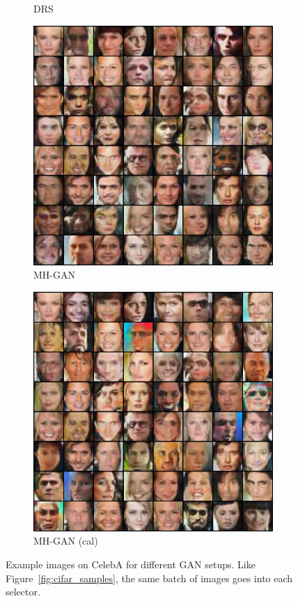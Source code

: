 \begin{figure}[htbp]
\begin{subfigure}[b]{0.49\textwidth}
       \caption{DRS}
    \end{subfigure}
    \begin{subfigure}[b]{0.49\textwidth}
       \centering
       \includegraphics[width=\exfactor\textwidth]{figures/celeba/31_base_raw_MH.jpg}
       \caption{MH-GAN}
    \end{subfigure}
    \begin{subfigure}[b]{0.49\textwidth}
       \centering
       \includegraphics[width=\exfactor\textwidth]{figures/celeba/31_base_iso_MH.jpg}
       \caption{MH-GAN (cal)}
    \end{subfigure}
    \caption{
    Example images on CelebA for different GAN setups.
    Like Figure~\ref{fig:cifar_samples}, the same batch of images goes into each selector.
    }
    \label{fig:celeba_samples}
\end{figure}
